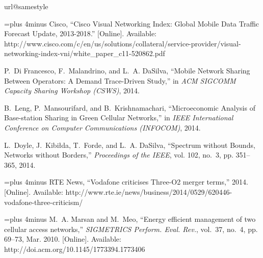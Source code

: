 \documentclass[10pt,journal,cspaper,compsoc]{IEEEtran}
\begin{document}
\begin{thebibliography}{10}
\providecommand{\url}[1]{#1}
\csname url@samestyle\endcsname
\providecommand{\newblock}{\relax}
\providecommand{\bibinfo}[2]{#2}
\providecommand{\BIBentrySTDinterwordspacing}{\spaceskip=0pt\relax}
\providecommand{\BIBentryALTinterwordstretchfactor}{4}
\providecommand{\BIBentryALTinterwordspacing}{\spaceskip=\fontdimen2\font plus
\BIBentryALTinterwordstretchfactor\fontdimen3\font minus
  \fontdimen4\font\relax}
\providecommand{\BIBforeignlanguage}[2]{{\expandafter\ifx\csname l@#1\endcsname\relax
\typeout{** WARNING: IEEEtran.bst: No hyphenation pattern has been}\typeout{** loaded for the language `#1'. Using the pattern for}\typeout{** the default language instead.}\else
\language=\csname l@#1\endcsname
\fi
#2}}
\providecommand{\BIBdecl}{\relax}
\BIBdecl

\BIBentryALTinterwordspacing
Cisco, ``{Cisco Visual Networking Index: Global Mobile Data Traffic Forecast
  Update, 2013-2018}.'' [Online]. Available:
  \url{http://www.cisco.com/c/en/us/solutions/collateral/service-provider/visual-networking-index-vni/white_paper_c11-520862.pdf}
\BIBentrySTDinterwordspacing

P.~{Di Francesco}, F.~Malandrino, and L.~A. DaSilva, ``{Mobile Network Sharing
  Between Operators: A Demand Trace-Driven Study},'' in \emph{ACM SIGCOMM
  Capacity Sharing Workshop (CSWS)}, 2014.

B.~Leng, P.~Mansourifard, and B.~Krishnamachari, ``{Microeconomic Analysis of
  Base-station Sharing in Green Cellular Networks},'' in \emph{IEEE
  International Conference on Computer Communications (INFOCOM)}, 2014.

L.~Doyle, J.~Kibi{\l}da, T.~Forde, and L.~A. DaSilva, ``{Spectrum without
  Bounds, Networks without Borders},'' \emph{Proceedings of the IEEE}, vol.
  102, no.~3, pp. 351--365, 2014.

\BIBentryALTinterwordspacing
{RTE News}, ``{Vodafone criticises Three-O2 merger terms},'' 2014. [Online].
  Available:
  \url{http://www.rte.ie/news/business/2014/0529/620446-vodafone-three-criticism/}
\BIBentrySTDinterwordspacing

\BIBentryALTinterwordspacing
M.~A. Marsan and M.~Meo, ``Energy efficient management of two cellular access
  networks,'' \emph{SIGMETRICS Perform. Eval. Rev.}, vol.~37, no.~4, pp.
  69--73, Mar. 2010. [Online]. Available:
  \url{http://doi.acm.org/10.1145/1773394.1773406}
\BIBentrySTDinterwordspacing


\end{thebibliography}
\end{document}
